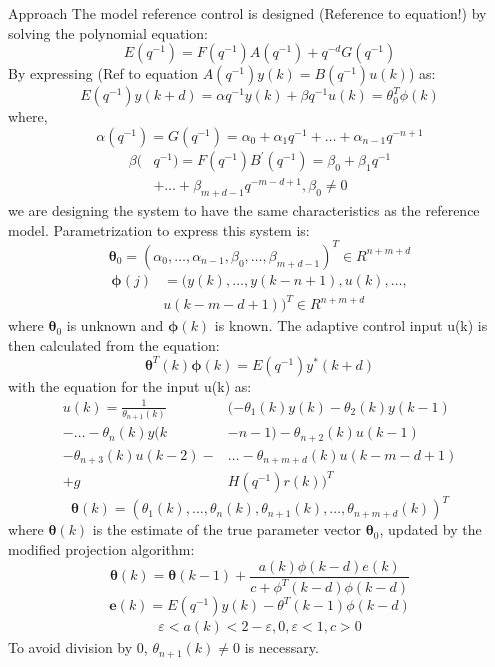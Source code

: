 \begin{section}{Approach}
The model reference control is designed (Reference to equation!) by solving the polynomial equation:
    \begin{equation}
	E(q^{-1})=F(q^{-1})A(q^{-1})+q^{-d}G(q^{-1})
	\end{equation}
By expressing (Ref to equation $A(q^{-1})y(k)=B(q^{-1})u(k)$) as:
	\begin{equation}
	E(q^{-1})y(k+d)={\alpha}q^{-1}y(k) + {\beta}q^{-1}u(k)=\theta_0^T\phi(k)
	\end{equation}
where,
	\begin{equation}
	\alpha(q^{-1})=G(q^{-1})=\alpha_0+\alpha_1q^{-1}+ \dots +\alpha_{n-1}q^{-n+1}
	\end{equation}
	\begin{align}
	\beta( & q^{-1})=F(q^{-1})B^{'}(q^{-1})=\beta_0+\beta_1q^{-1} \nonumber \\
	& + \dots +\beta_{m+d-1}q^{-m-d+1}, \beta_0\neq0
	\end{align}
we are designing the system to have the same characteristics as the reference model. Parametrization to express this system is:
	\begin{equation}
	\bm{\theta}_0=(\alpha_0, \dots ,\alpha_{n-1},\beta_0, \dots ,\beta_{m+d-1})^T \in R^{n+m+d}
	\end{equation}
	\begin{align}
	\bm{\phi}(j)&=(y(k), \dots ,y(k-n+1),u(k), \dots , \nonumber \\
	& u(k-m-d+1))^T \in R^{n+m+d}
	\end{align}
where $\bm{\theta}_0$ is unknown and $\bm{\phi}(k)$ is known.
	The adaptive control input u(k) is then calculated from the equation:
	\begin{equation}
	\bm{\theta}^T(k)\bm{\phi}(k)=E(q^{-1})y^{*}(k+d)
	\end{equation}
with the equation for the input u(k) as:
	\begin{align}
	u(k)=\frac{1}{\theta_{n+1}(k)}&(-\theta_1(k)y(k)-\theta_2(k)y(k-1)  \nonumber \\
    -\dots-\theta_n(k)y(k&-n-1)-\theta_{n+2}(k)u(k-1)  \\
	-\theta_{n+3}(k)u(k-2)-& \dots - \theta_{n+m+d}(k)u(k-m-d+1) \nonumber \\
	+g&H(q^{-1})r(k))^T \nonumber
	\end{align}
	\begin{equation}
	\bm{\theta}(k)=(\theta_1(k), \dots ,\theta_n(k),\theta_{n+1}(k), \dots ,\theta_{n+m+d}(k))^T
	\end{equation}
where $\bm{\theta}(k)$ is the estimate of the true parameter vector $\bm{\theta}_0$, updated by the modified projection algorithm:
	\begin{equation}
	\bm{\theta}(k)=\bm{\theta}(k-1)+\frac{a(k)\phi(k-d)e(k)}{c+\phi^T(k-d)\phi(k-d)}
	\end{equation}
	\begin{equation}
	\bm{e}(k)=E(q^{-1})y(k)-\theta^T(k-1)\phi(k-d)
	\end{equation}
	\begin{align*}
	\varepsilon<a(k)<2-\varepsilon, 0,\varepsilon<1, c>0
	\end{align*}
To avoid division by $0$, $\theta_{n+1}(k)\neq0$ is necessary.


\end{section}
